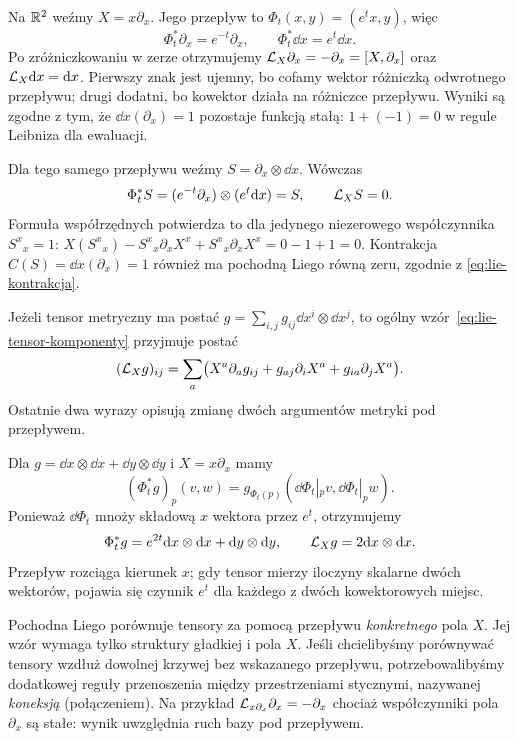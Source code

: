\begin{przyklad}
Na $\mathbb{R}^2$ weźmy $X=x\partial_x$. Jego przepływ to
$\Phi_t(x,y)=(e^tx,y)$, więc
\[
 \Phi_t^*\partial_x=e^{-t}\partial_x,
 \qquad \Phi_t^*\dd x=e^t\dd x.
\]
Po zróżniczkowaniu w zerze otrzymujemy
$\mathcal L_X\partial_x=-\partial_x=[X,\partial_x]$
oraz $\mathcal L_X\mathrm d x=\mathrm d x$. Pierwszy znak jest ujemny,
bo cofamy wektor różniczką odwrotnego przepływu;
drugi dodatni, bo kowektor działa na różniczce przepływu.
Wyniki są zgodne z tym, że $\dd x(\partial_x)=1$
pozostaje funkcją stałą: $1+(-1)=0$ w regule
Leibniza dla ewaluacji.
\end{przyklad}

\begin{przyklad}
Dla tego samego przepływu weźmy
$S=\partial_x\otimes\dd x$. Wówczas
\[
 \Phi_t^*S=(e^{-t}\partial_x)\otimes(e^t\mathrm d x)=S,
 \qquad \mathcal L_XS=0.
\]
Formuła współrzędnych potwierdza to dla jedynego
niezerowego współczynnika $S^x{}_x=1$:
$X(S^x{}_x)-S^x{}_x\partial_xX^x+
S^x{}_x\partial_xX^x=0-1+1=0$.
Kontrakcja $C(S)=\dd x(\partial_x)=1$ również ma
pochodną Liego równą zeru, zgodnie z
\eqref{eq:lie-kontrakcja}.
\end{przyklad}

Jeżeli tensor metryczny ma postać
$g=\sum_{i,j}g_{ij}\dd x^i\otimes\dd x^j$, to
ogólny wzór~\eqref{eq:lie-tensor-komponenty} przyjmuje postać
\[
 (\mathcal L_Xg)_{ij}
 =\sum_a\bigl(X^a\partial_a g_{ij}
  +g_{aj}\partial_iX^a+g_{ia}\partial_jX^a\bigr).
\]
Ostatnie dwa wyrazy opisują zmianę dwóch argumentów
metryki pod przepływem.

\begin{przyklad}
Dla $g=\dd x\otimes\dd x+\dd y\otimes\dd y$ i
$X=x\partial_x$ mamy
\[
 (\Phi_t^*g)_p(v,w)
 =g_{\Phi_t(p)}(\dd\Phi_t|_p v,\dd\Phi_t|_p w).
\]
Ponieważ $\dd\Phi_t$ mnoży składową $x$ wektora przez
$e^t$, otrzymujemy
\[
 \Phi_t^*g=e^{2t}\mathrm d x\otimes\mathrm d x
             +\mathrm d y\otimes\mathrm d y,\qquad
 \mathcal L_Xg=2\mathrm d x\otimes\mathrm d x.
\]
Przepływ rozciąga kierunek $x$; gdy tensor mierzy
iloczyny skalarne dwóch wektorów, pojawia się czynnik
$e^t$ dla każdego z dwóch kowektorowych miejsc.
\end{przyklad}

\begin{uwaga}
Pochodna Liego porównuje tensory za pomocą przepływu
\emph{konkretnego} pola $X$. Jej wzór wymaga tylko struktury
gładkiej i pola $X$. Jeśli chcielibyśmy porównywać tensory
wzdłuż dowolnej krzywej bez wskazanego przepływu,
potrzebowalibyśmy dodatkowej reguły przenoszenia między
przestrzeniami stycznymi, nazywanej \emph{koneksją} (połączeniem).
Na przykład $\mathcal L_{x\partial_x}\partial_x=-\partial_x$
chociaż współczynniki pola $\partial_x$ są stałe:
wynik uwzględnia ruch bazy pod przepływem.
\end{uwaga}

